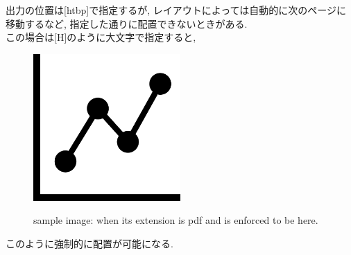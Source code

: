     出力の位置は[htbp]で指定するが, レイアウトによっては自動的に次のページに移動するなど, 指定した通りに配置できないときがある.\\
    この場合は[H]のように大文字で指定すると,
    \begin{figure}[H]
        \centering   
        \includegraphics[width=0.5\textwidth]{img/sample/sample_pdf.pdf}
        \label{Fig:sample_pdf_here}
        \caption[sample image (pdf, here)]{sample image: when its extension is pdf and is enforced to be here.}
    \end{figure}
    このように強制的に配置が可能になる.

